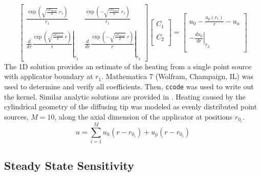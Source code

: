\documentclass{article}         %
\theoremstyle{definition}
\theoremstyle{remark}
\begin{document}
\[
\begin{bmatrix}
    \frac{\exp\left( \sqrt{\frac{\omega c_\textit{blood}}{k}} \; r_1 \right)}{r_1}  
  & 
    \frac{\exp\left(-\sqrt{\frac{\omega c_\textit{blood}}{k}} \; r_1 \right)}{r_1}  
  \\
  \\
  \left.
   \frac{d}{dr}
    \frac{\exp\left( \sqrt{\frac{\omega c_\textit{blood}}{k}} \; r \right)}{r}  
  \right|_{r_2}
  & 
  \left.
   \frac{d}{dr}
    \frac{\exp\left(-\sqrt{\frac{\omega c_\textit{blood}}{k}} \; r \right)}{r}  
  \right|_{r_2}
\end{bmatrix}
\begin{bmatrix}
  C_1 \\
  \\
  C_2 \\
\end{bmatrix}
= 
\begin{bmatrix}
      u_0 - \frac{u_p(r_1)}{r} - u_a    \\
      \\
  - \left. \frac{d u_p}{dr} 
  \right|_{r_2}\\
\end{bmatrix}
\]
The 1D solution provides an estimate of the heating from a single point source
with applicator boundary at $r_1$. Mathematica 7 (Wolfram, Champaign, IL) was used
to determine and verify all coefficients. Then, \verb#ccode# was used to write out the kernel.
Similar analytic solutions are provided in \cite{Giordano2010,Vyas1992,Deng2002}.
Heating caused by the cylindrical geometry of the diffusing tip was modeled as
evenly distributed point sources, $M = 10$, along the axial dimension of the
applicator at positions $r_{0_i}$. 
\begin{equation}\label{GreenSuperPosition}
  u = \sum_{i=1}^M u_h( r-r_{0_i}) + u_p( r-r_{0_i})
\end{equation}

\subsection{Steady State Sensitivity}
\end{document}
